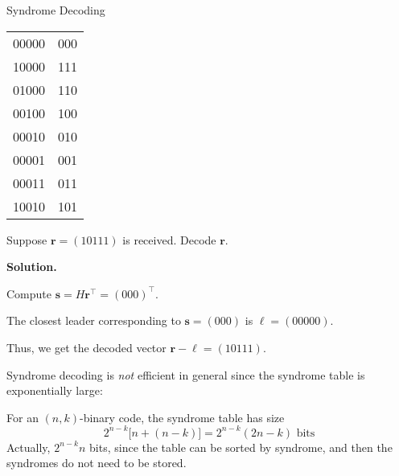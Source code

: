 \begin{Example}{Syndrome Decoding}{}
\begin{table}[H]
\begin{tabularx}{0.5\linewidth}{@{}YY@{}}
            00000         & 000       \\
            10000         & 111       \\
            01000         & 110       \\
            00100         & 100       \\
            00010         & 010       \\
            00001         & 001       \\
            00011         & 011       \\
            10010         & 101
        \end{tabularx}
    \end{table}
    Suppose $ \symbf{r}=(10111) $ is received. Decode $ \symbf{r} $.

    \textbf{Solution.}

    Compute $ \symbf{s}=H\symbf{r}^\top=(000)^\top $.

    The closest leader corresponding to $ \symbf{s}=(000) $ is $ \symbf{\ell}=(00000) $.

    Thus, we get the decoded vector $ \symbf{r}-\symbf{\ell}=(10111) $.
\end{Example}
\begin{Remark}{}{}
    Syndrome decoding is \emph{not} efficient in general since
    the syndrome table is exponentially large:

    For an $ (n,k) $-binary code, the syndrome table has size
    \[ 2^{n-k}\bigl[n+(n-k)]=2^{n-k}(2n-k)\text{ bits} \]
    Actually, $ 2^{n-k}n $ bits, since the table can be
    sorted by syndrome, and then the syndromes do not need to be stored.
\end{Remark}
